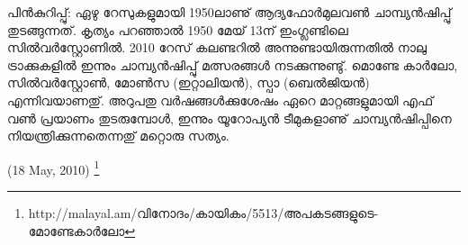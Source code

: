 പിന്‍കുറിപ്പു്: ഏഴു റേസുകളുമായി 1950ലാണു് ആദ്യഫോര്‍മുലവണ്‍ ചാമ്പ്യന്‍ഷിപ്പു് തുടങ്ങുന്നത്. കൃത്യം പറഞ്ഞാല്‍ 
1950 മേയ് 13ന് ഇംഗ്ലണ്ടിലെ സില്‍വര്‍സ്റ്റോണില്‍. 2010 റേസ് കലണ്ടറില്‍ അന്നുണ്ടായിരുന്നതില്‍ നാലു 
ട്രാക്കുകളില്‍ ഇന്നും ചാമ്പ്യന്‍ഷിപ്പു് മത്സരങ്ങള്‍ നടക്കുന്നുണ്ടു്. മൊണ്ടേ കാര്‍ലോ, സില്‍വര്‍സ്റ്റോണ്‍, മോണ്‍സ 
(ഇറ്റാലിയന്‍), സ്പാ (ബെല്‍ജിയന്‍) എന്നിവയാണതു്. അറുപതു വര്‍ഷങ്ങള്‍ക്കുശേഷം ഏറെ മാറ്റങ്ങളുമായി എഫ് 
വണ്‍ പ്രയാണം തുടരുമ്പോള്‍, ഇന്നും യൂറോപ്യന്‍ ടീമുകളാണു് ചാമ്പ്യന്‍ഷിപ്പിനെ നിയന്ത്രിക്കുന്നതെന്നതു് മറ്റൊരു 
സത്യം.

\begin{flushright}(18 May, 2010)
\footnote{http://malayal.am/വിനോദം/കായികം/5513/അപകടങ്ങളുടെ-മോണ്ടേകാര്‍ലോ}\end{flushright}

\newpage
